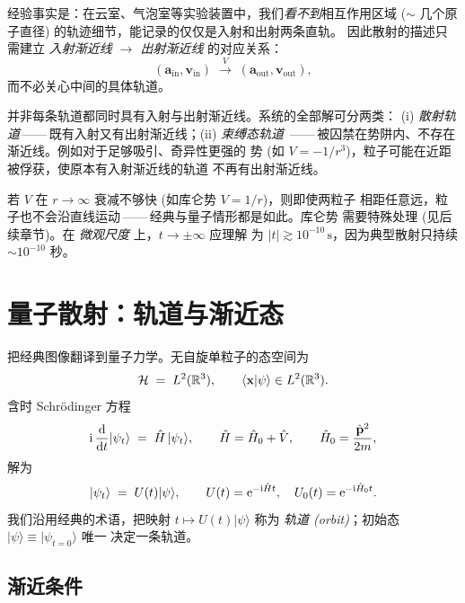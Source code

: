 经验事实是：在云室、气泡室等实验装置中，我们\emph{看不到}相互作用区域
($\sim$ 几个原子直径) 的轨迹细节，能记录的仅仅是入射和出射两条直轨。
因此散射的描述只需建立 \emph{入射渐近线 $\to$ 出射渐近线} 的对应关系：
\[
  (\mathbf{a}_{\text{in}},\mathbf{v}_{\text{in}})
  \;\xrightarrow{\;V\;}\;
  (\mathbf{a}_{\text{out}},\mathbf{v}_{\text{out}}),
\]
而不必关心中间的具体轨道。

\begin{remark}[束缚态破坏对应关系]
\label{rmk:1P-bound}
并非每条轨道都同时具有入射与出射渐近线。系统的全部解可分两类：
(i) \emph{散射轨道}\,——\,既有入射又有出射渐近线；(ii) \emph{束缚态轨道}
\,——\,被囚禁在势阱内、不存在渐近线。例如对于足够吸引、奇异性更强的
势 (如 $V=-1/r^3$)，粒子可能在近距被俘获，使原本有入射渐近线的轨道
不再有出射渐近线。
\end{remark}

\begin{remark}[需要排除的势]
\label{rmk:1P-Vexclude}
若 $V$ 在 $r\to\infty$ 衰减不够快 (如库仑势 $V=1/r$)，则即使两粒子
相距任意远，粒子也不会沿直线运动\,——\,经典与量子情形都是如此。库仑势
需要特殊处理 (见后续章节)。在 \emph{微观尺度} 上，$t\to\pm\infty$ 应理解
为 $|t|\gtrsim 10^{-10}\,\text{s}$，因为典型散射只持续 $\sim 10^{-10}$ 秒。
\end{remark}

\section{量子散射：轨道与渐近态}
\label{sec:1P-quantum}

把经典图像翻译到量子力学。无自旋单粒子的态空间为
\[
  \mathcal{H} \;=\; L^2(\mathbb{R}^3),\qquad \langle \mathbf{x}|\psi\rangle \in L^2(\mathbb{R}^3).
\]
含时 Schrödinger 方程
\begin{equation}
  \mathrm{i}\,\frac{\mathrm{d}}{\mathrm{d} t}|\psi_t\rangle \;=\; \hat{H}\,|\psi_t\rangle,
  \qquad \hat{H} = \hat{H}_0 + \hat{V},\qquad \hat{H}_0=\frac{\hat{\mathbf{p}}^2}{2m},
  \label{eq:1P-Schrodinger}
\end{equation}
解为
\begin{equation}
  |\psi_t\rangle \;=\; U(t)|\psi\rangle, \qquad
  U(t) = \mathrm{e}^{-\mathrm{i} \hat{H} t}, \quad
  U_0(t) = \mathrm{e}^{-\mathrm{i} \hat{H}_0 t}.
  \label{eq:1P-Ut}
\end{equation}
我们沿用经典的术语，把映射 $t\mapsto U(t)|\psi\rangle$ 称为
\emph{轨道 (orbit)}；初始态 $|\psi\rangle\equiv |\psi_{t=0}\rangle$ 唯一
决定一条轨道。

\subsection{渐近条件}
\label{ssec:1P-asympCond}

